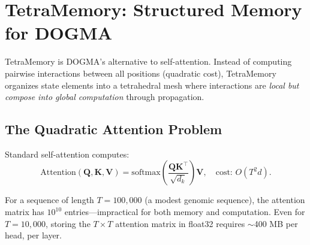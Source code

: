 \section{TetraMemory: Structured Memory for DOGMA}
\label{sec:tetradata-tetramemory}

TetraMemory is DOGMA's alternative to self-attention. Instead of computing
pairwise interactions between all positions (quadratic cost), TetraMemory
organizes state elements into a tetrahedral mesh where interactions are
\emph{local but compose into global computation} through propagation.

\subsection{The Quadratic Attention Problem}
\label{sec:quadratic-problem}

Standard self-attention computes:
\begin{equation}
\text{Attention}(\mathbf{Q}, \mathbf{K}, \mathbf{V}) = \text{softmax}\left(\frac{\mathbf{Q}\mathbf{K}^\top}{\sqrt{d_k}}\right)\mathbf{V}, \quad \text{cost: } O(T^2 d).
\end{equation}

For a sequence of length $T = 100{,}000$ (a modest genomic sequence), the
attention matrix has $10^{10}$ entries---impractical for both memory and
computation. Even for $T = 10{,}000$, storing the $T \times T$ attention matrix
in float32 requires $\sim$400 MB per head, per layer.

